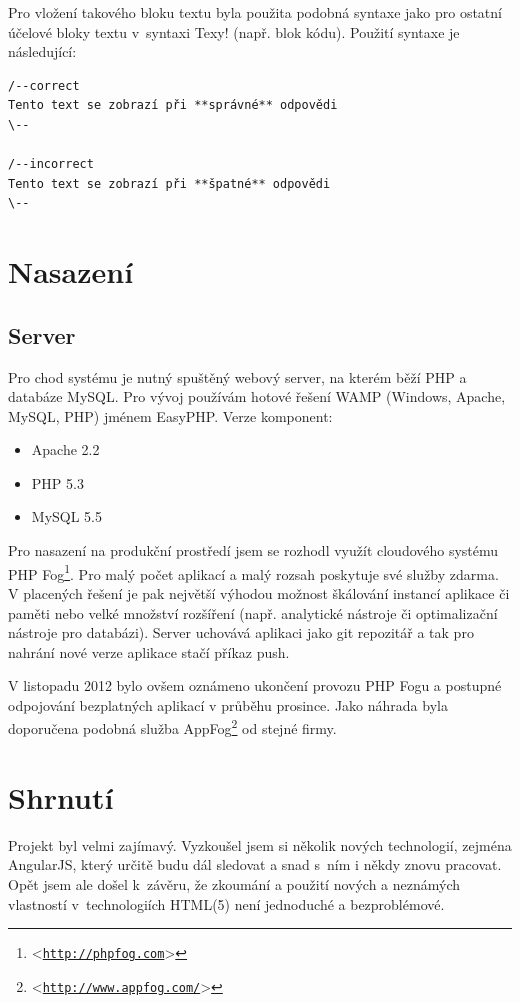 \documentclass[11pt,twoside,a4paper]{book}
\let\oldUrl\url									%
\renewcommand\url[1]{<\texttt{\oldUrl{#1}}>}
\begin{document}
Pro vložení takového bloku textu byla použita podobná syntaxe jako pro ostatní účelové bloky textu v~syntaxi Texy!
(např. blok kódu). Použití syntaxe je následující:

\begin{lstlisting}[caption=Syntaxe doplňkových textů]
/--correct
Tento text se zobrazí při **správné** odpovědi
\--

/--incorrect
Tento text se zobrazí při **špatné** odpovědi
\--
\end{lstlisting}



\chapter{Nasazení}

\section{Server}
Pro chod systému je nutný spuštěný webový server, na kterém běží PHP a databáze MySQL. Pro vývoj používám hotové řešení WAMP (Windows, Apache, MySQL, PHP) jménem EasyPHP. Verze komponent:

\begin{itemize}
	\item Apache 2.2
	\item PHP 5.3
	\item MySQL 5.5
\end{itemize}

Pro nasazení na produkční prostředí jsem se rozhodl využít cloudového systému PHP Fog\footnote{\url{http://phpfog.com}}. Pro malý počet aplikací a malý rozsah poskytuje své služby zdarma. V placených řešení je pak největší výhodou možnost škálování instancí aplikace či paměti nebo velké množství rozšíření (např. analytické nástroje či optimalizační nástroje pro databázi). Server uchovává aplikaci jako git repozitář a tak pro nahrání nové verze aplikace stačí příkaz push.

V listopadu 2012 bylo ovšem oznámeno ukončení provozu PHP Fogu a postupné odpojování bezplatných aplikací v průběhu prosince. Jako náhrada byla doporučena podobná služba AppFog\footnote{\url{http://www.appfog.com/}} od stejné firmy.



\chapter{Shrnutí}
Projekt byl velmi zajímavý. Vyzkoušel jsem si několik nových technologií, zejména AngularJS, který určitě budu dál sledovat a snad s~ním i někdy znovu pracovat. Opět jsem ale došel k~závěru, že zkoumání a použití nových a neznámých vlastností v~technologiích HTML(5) není jednoduché a bezproblémové.
\end{document}
